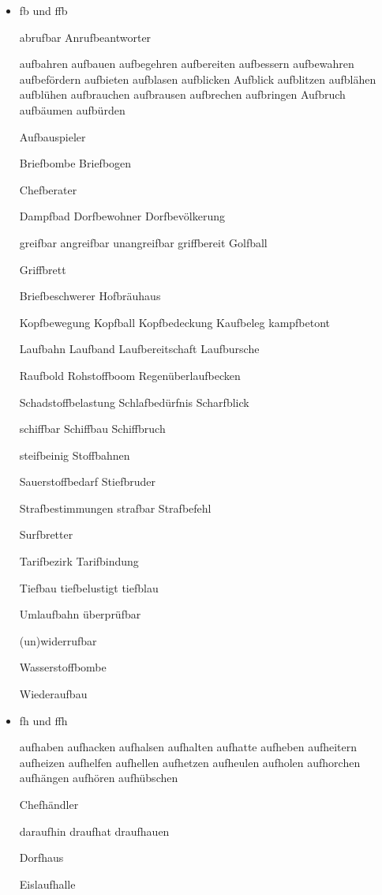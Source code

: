 \begin{itemize}

\item \mbox{fb} und \mbox{ffb}

abrufbar 
Anrufbeantworter 

aufbahren aufbauen aufbegehren aufbereiten aufbessern aufbewahren aufbefördern aufbieten aufblasen aufblicken Aufblick aufblitzen aufblähen aufblühen aufbrauchen aufbrausen aufbrechen aufbringen Aufbruch aufbäumen aufbürden 

Aufbauspieler 

Briefbombe Briefbogen 

Chefberater 

Dampfbad Dorfbewohner Dorfbevölkerung

greifbar angreifbar unangreifbar griffbereit Golfball 

Griffbrett

Briefbeschwerer Hofbräuhaus 

Kopfbewegung Kopfball Kopfbedeckung Kaufbeleg kampfbetont 

Laufbahn Laufband Laufbereitschaft Laufbursche 

Raufbold Rohstoffboom Regenüberlaufbecken

Schadstoffbelastung Schlafbedürfnis Scharfblick 

schiffbar Schiffbau Schiffbruch 

steifbeinig Stoffbahnen

Sauerstoffbedarf Stiefbruder 

Strafbestimmungen strafbar Strafbefehl

Surfbretter

Tarifbezirk Tarifbindung 

Tiefbau tiefbelustigt tiefblau 

Umlaufbahn überprüfbar

(un)widerrufbar

Wasserstoffbombe

Wiederaufbau
 

\item \mbox{fh} und \mbox{ffh}

aufhaben aufhacken aufhalsen aufhalten aufhatte aufheben aufheitern aufheizen aufhelfen aufhellen aufhetzen aufheulen aufholen aufhorchen aufhängen aufhören aufhübschen

Chefhändler

daraufhin draufhat draufhauen 

Dorfhaus

Eislaufhalle


\end{itemize}
